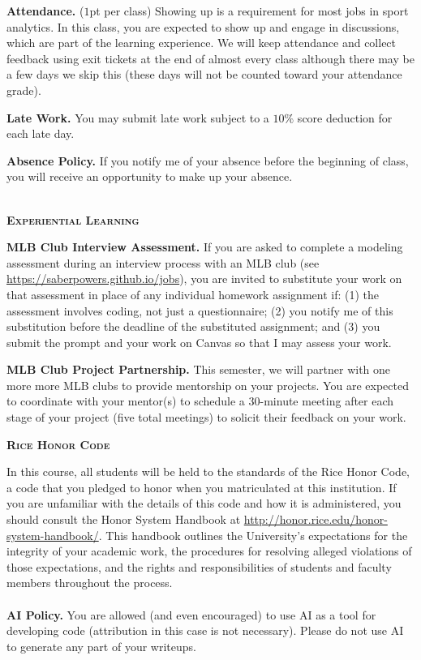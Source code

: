 \documentclass[11pt]{article}
\begin{document}
\begin{adjustwidth}{1cm}{0cm}
  \textbf{Attendance.} ($1$pt per class) Showing up is a requirement for most jobs in sport analytics. In this class, you are expected to show up and engage in discussions, which are part of the learning experience. We will keep attendance and collect feedback using exit tickets at the end of almost every class although there may be a few days we skip this (these days will not be counted toward your attendance grade).

  \textbf{Late Work.} You may submit late work subject to a $10\%$ score deduction for each late day.

  \textbf{Absence Policy.} If you notify me of your absence before the beginning of class, you will receive an opportunity to make up your absence.
\end{adjustwidth}

~\\
{\textbf{\textsc{Experiential Learning}}}
\begin{adjustwidth}{1cm}{0cm}
  \textbf{MLB Club Interview Assessment.} If you are asked to complete a modeling assessment during an interview process with an MLB club (see \url{https://saberpowers.github.io/jobs}), you are invited to substitute your work on that assessment in place of any individual homework assignment if: (1) the assessment involves coding, not just a questionnaire; (2) you notify me of this substitution before the deadline of the substituted assignment; and (3) you submit the prompt and your work on Canvas so that I may assess your work.

  \textbf{MLB Club Project Partnership.} This semester, we will partner with one more more MLB clubs to provide mentorship on your projects. You are expected to coordinate with your mentor(s) to schedule a 30-minute meeting after each stage of your project (five total meetings) to solicit their feedback on your work.
\end{adjustwidth}

\newpage
\textbf{\textsc{Rice Honor Code}}
\begin{adjustwidth}{1cm}{0cm}
  In this course, all students will be held to the standards of the Rice Honor Code, a code that you pledged to honor when you matriculated at this institution. If you are unfamiliar with the details of this code and how it is administered, you should consult the Honor System Handbook at \url{http://honor.rice.edu/honor-system-handbook/}. This handbook outlines the University's expectations for the integrity of your academic work, the procedures for resolving alleged violations of those expectations, and the rights and responsibilities of students and faculty members throughout the process.\\
  ~\\
  \textbf{AI Policy.} You are allowed (and even encouraged) to use AI as a tool for developing code (attribution in this case is not necessary). Please do not use AI to generate any part of your writeups.
\end{adjustwidth}
\end{document}
